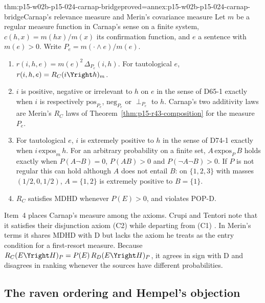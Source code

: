 \begin{hbtheorem}{thm:p15-w02b-p15-024-carnap-bridge}{proved=annex:p15-w02b-p15-024-carnap-bridge}{Carnap's relevance measure and Merin's covariance measure}
Let \(m\) be a regular measure function in Carnap's sense on a finite
system, \(c(h,x)=m(hx)/m(x)\) its confirmation function, and \(e\) a
sentence with \(m(e)>0\). Write \(P_e=m(\cdot\land e)/m(e)\).
\begin{enumerate}
\item \(r(i,h,e)=m(e)^2\,\Delta_{P_e}(i,h)\). For tautological \(e\),
  \(r(i,h,e)=R_C(i\Yright h)_m\).
\item \(i\) is positive, negative or irrelevant to \(h\) on \(e\) in the
  sense of D65-1 exactly when \(i\) is respectively
  \(\mathrm{pos}_{P_e}\), \(\mathrm{neg}_{P_e}\) or \(\perp_{P_e}\)
  to \(h\). Carnap's two additivity laws are Merin's \(R_C\) laws of
  Theorem~\ref{thm:p15-r43-composition} for the measure \(P_e\).
\item For tautological \(e\), \(i\) is extremely positive to \(h\) in
  the sense of D74-1 exactly when \(i\,\mathrm{expos}_m\,h\). For an
  arbitrary probability on a finite set, \(A\,\mathrm{expos}_P\,B\)
  holds exactly when \(P(A\neg B)=0\), \(P(AB)>0\) and
  \(P(\neg A\neg B)>0\). If \(P\) is not regular this can hold although
  \(A\) does not entail \(B\): on \(\{1,2,3\}\) with masses
  \((1/2,0,1/2)\), \(A=\{1,2\}\) is extremely positive to
  \(B=\{1\}\).
\item \(R_C\) satisfies MDHD whenever \(P(E)>0\), and violates POP-D.
\end{enumerate}
\end{hbtheorem}

Item~4 places Carnap's measure among the axioms. Crupi and Tentori
note that it satisfies their disjunction axiom (C2) while departing
from (C1) \cite[p.~656, n.~9]{CrupiTentori2016Confirmation}. In Merin's
terms it shares MDHD with D but lacks the axiom he treats as the entry
condition for a first-resort measure. Because
\(R_C(E\Yright H)_P=P(E)\,R_D(E\Yright H)_P\), it agrees in sign with D
and disagrees in ranking whenever the sources have different
probabilities.

\subsection{The raven ordering and Hempel's objection}
\label{sec:p15-w02b-p15-024-raven}

